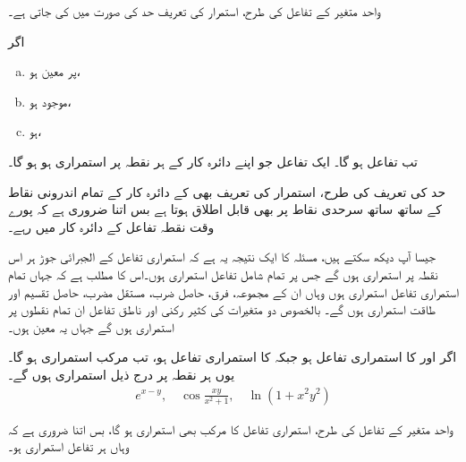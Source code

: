 واحد متغیر کے تفاعل کی طرح، استمرار کی تعریف  حد کی صورت میں کی جاتی ہے۔

اگر 
\begin{enumerate}[a.]
\item
{} پر  معین ہو،
\item
{} موجود ہو،
\item
{} ہو،
\end{enumerate} 
تب تفاعل       ہو گا۔ ایک  تفاعل  جو اپنے دائرہ کار کے  ہر نقطہ پر استمراری ہو ہو گا۔

حد کی تعریف کی طرح،  استمرار کی تعریف بھی  کے دائرہ کار کے تمام اندرونی نقاط کے ساتھ  ساتھ  سرحدی نقاط پر بھی قابل اطلاق  ہوتا ہے بس اتنا ضروری ہے کہ پورے  وقت  نقطہ تفاعل کے دائرہ کار میں رہے۔

جیسا آپ  دیکھ سکتے ہیں، مسئلہ     کا ایک نتیجہ  یہ ہے  کہ استمراری تفاعل  کے الجبرائی  جوڑ  ہر اس نقطہ پر استمراری ہوں گے جس پر تمام شامل تفاعل استمراری ہوں۔اس کا مطلب ہے کہ جہاں  تمام   استمراری تفاعل استمراری ہوں وہاں ان  کے مجموعہ، فرق، حاصل ضرب،  مستقل مضرب، حاصل تقسیم اور طاقت استمراری ہوں گے۔   بالخصوص دو متغیرات کی کثیر رکنی اور ناطق تفاعل ان تمام نقطوں پر استمراری ہوں گے جہاں یہ معین ہوں۔

اگر   اور  کا استمراری تفاعل   ہو  جبکہ   کا استمراری تفاعل  ہو، تب  مرکب     استمراری ہو گا۔یوں  ہر نقطہ  پر درج ذیل استمراری ہوں گے۔
\begin{align*}
e^{x-y},\quad \cos\frac{xy}{x^2+1},\quad \ln(1+x^2y^2)
\end{align*}

واحد متغیر کے تفاعل کی طرح، استمراری تفاعل کا  مرکب  بھی استمراری ہو گا،  بس اتنا ضروری ہے کہ وہاں  ہر  تفاعل  استمراری ہو۔

